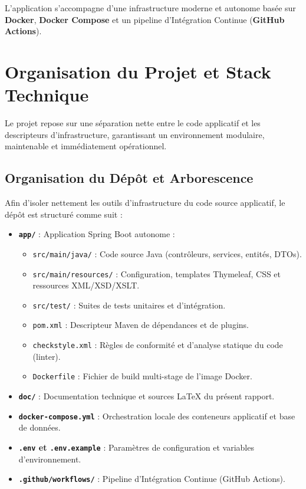 \documentclass[12pt,a4paper]{article}
\begin{document}
L'application s'accompagne d'une infrastructure moderne et autonome basée sur \textbf{Docker}, \textbf{Docker Compose} et un pipeline d'Intégration Continue (\textbf{GitHub Actions}).

\section{Organisation du Projet et Stack Technique}

Le projet repose sur une séparation nette entre le code applicatif et les descripteurs d'infrastructure, garantissant un environnement modulaire, maintenable et immédiatement opérationnel.

\subsection{Organisation du Dépôt et Arborescence}

Afin d'isoler nettement les outils d'infrastructure du code source applicatif, le dépôt est structuré comme suit :
\begin{itemize}[leftmargin=*]
    \item \textbf{\texttt{app/}} : Application Spring Boot autonome :
    \begin{itemize}
        \item \texttt{src/main/java/} : Code source Java (contrôleurs, services, entités, DTOs).
        \item \texttt{src/main/resources/} : Configuration, templates Thymeleaf, CSS et ressources XML/XSD/XSLT.
        \item \texttt{src/test/} : Suites de tests unitaires et d'intégration.
        \item \texttt{pom.xml} : Descripteur Maven de dépendances et de plugins.
        \item \texttt{checkstyle.xml} : Règles de conformité et d'analyse statique du code (linter).
        \item \texttt{Dockerfile} : Fichier de build multi-stage de l'image Docker.
    \end{itemize}
    \item \textbf{\texttt{doc/}} : Documentation technique et sources LaTeX du présent rapport.
    \item \textbf{\texttt{docker-compose.yml}} : Orchestration locale des conteneurs applicatif et base de données.
    \item \textbf{\texttt{.env} et \texttt{.env.example}} : Paramètres de configuration et variables d'environnement.
    \item \textbf{\texttt{.github/workflows/}} : Pipeline d'Intégration Continue (GitHub Actions).
\end{itemize}
\end{document}

